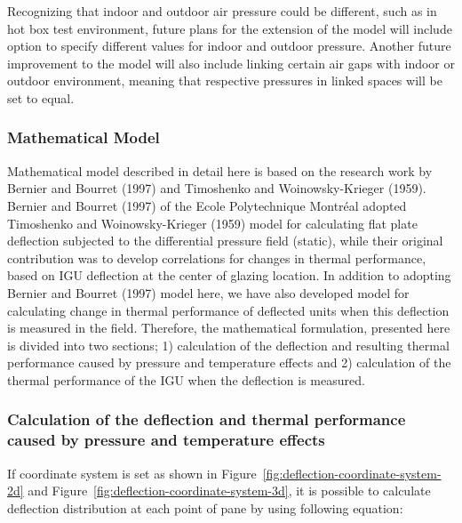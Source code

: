 Recognizing that indoor and outdoor air pressure could be different, such as in hot box test environment, future plans for the extension of the model will include option to specify different values for indoor and outdoor pressure. Another future improvement to the model will also include linking certain air gaps with indoor or outdoor environment, meaning that respective pressures in linked spaces will be set to equal.

\subsubsection{Mathematical Model}\label{mathematical-model-000}

Mathematical model described in detail here is based on the research work by Bernier and Bourret (1997) and Timoshenko and Woinowsky-Krieger (1959). Bernier and Bourret (1997) of the Ecole Polytechnique Montréal adopted Timoshenko and Woinowsky-Krieger (1959) model for calculating flat plate deflection subjected to the differential pressure field (static), while their original contribution was to develop correlations for changes in thermal performance, based on IGU deflection at the center of glazing location. In addition to adopting Bernier and Bourret (1997) model here, we have also developed model for calculating change in thermal performance of deflected units when this deflection is measured in the field. Therefore, the mathematical formulation, presented here is divided into two sections; 1) calculation of the deflection and resulting thermal performance caused by pressure and temperature effects and 2) calculation of the thermal performance of the IGU when the deflection is measured.

\subsubsection{Calculation of the deflection and thermal performance caused by pressure and temperature effects}\label{calculation-of-the-deflection-and-thermal-performance-caused-by-pressure-and-temperature-effects}

If coordinate system is set as shown in Figure~\ref{fig:deflection-coordinate-system-2d} and Figure~\ref{fig:deflection-coordinate-system-3d}, it is possible to calculate deflection distribution at each point of pane by using following equation:

